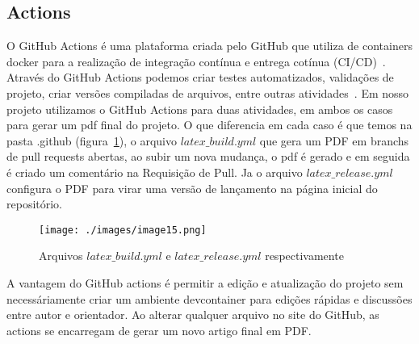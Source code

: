 \subsection{Actions}

O GitHub Actions é uma plataforma criada pelo GitHub que utiliza de containers docker para a realização de integração contínua e entrega cotínua (CI/CD)~\cite{github:02}. Através do GitHub Actions podemos criar testes automatizados, validações de projeto, criar versões compiladas de arquivos, entre outras atividades~\cite{github:02}. Em nosso projeto utilizamos o GitHub Actions para duas atividades, em ambos os casos para gerar um pdf final do projeto. O que diferencia em cada caso é que temos na pasta .github (figura~\ref{fig:image15}), o arquivo $latex\_build.yml$ que gera um PDF em branchs de pull requests abertas, ao subir um nova mudança, o pdf é gerado e em seguida é criado um comentário na Requisição de Pull. Ja o arquivo $latex\_release.yml$ configura o PDF para virar uma versão de lançamento na página inicial do repositório.

\begin{figure}[ht]
	\centering
	\texttt{[image: ./images/image15.png]}
	\caption{Arquivos $latex\_build.yml$ e $latex\_release.yml$ respectivamente}
	\label{fig:image15}
\end{figure}

A vantagem do GitHub actions é permitir a edição e atualização do projeto sem necessáriamente criar um ambiente devcontainer para edições rápidas e discussões entre autor e orientador. Ao alterar qualquer arquivo no site do GitHub, as actions se encarregam de gerar um novo artigo final em PDF.